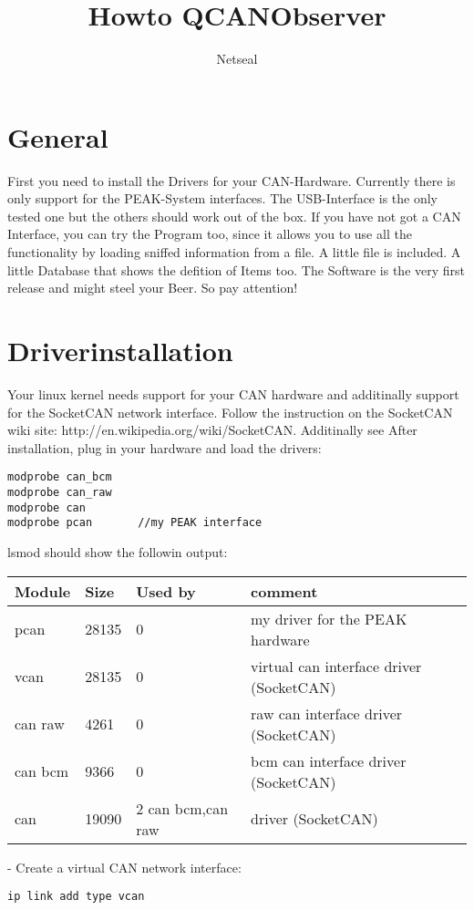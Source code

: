 \documentclass[a4paper,10pt]{article}
\title{Howto QCANObserver}
\author{Netseal}
\begin{document}
\maketitle
\section{General}
First you need to install the Drivers for your CAN-Hardware. Currently there is only support for the PEAK-System interfaces. 
The USB-Interface is the only tested one but the others should work out of the box. If you have not got a CAN Interface, 
you can try the Program too, since it allows you to use all the functionality by loading sniffed information from a file. 
A little file is included. A little Database that shows the defition of Items too. 
The Software is the very first release and might steel your Beer. So pay attention!


\section{Driverinstallation}
Your linux kernel needs support for your CAN hardware and additinally support for the SocketCAN network interface.
Follow the instruction on the SocketCAN wiki site: http://en.wikipedia.org/wiki/SocketCAN.
Additinally see
After installation, plug in your hardware and load the drivers:
\newline
\begin{verbatim}
modprobe can_bcm
modprobe can_raw
modprobe can
modprobe pcan		//my PEAK interface
\end{verbatim}

lsmod should show the followin output:\newline
\begin{tabular}[h]{|p{2cm}|p{2cm}|p{3cm}|p{4cm}|}
\hline
\textbf{Module}&\textbf{Size}&\textbf{Used by}&\textbf{comment}\\
\hline
\hline
pcan & 28135 & 0 & my driver for the PEAK hardware\\
\hline
vcan & 28135 & 0 & virtual can interface driver (SocketCAN)\\
\hline
can raw & 4261 & 0& raw can interface driver (SocketCAN)\\
\hline
can bcm & 9366 & 0& bcm can interface driver (SocketCAN)\\
\hline
can & 19090 & 2 can bcm,can raw & driver (SocketCAN)\\
\hline
\end{tabular}\newline
\newline
- Create a virtual CAN network interface:
\begin{verbatim}     
ip link add type vcan
\end{verbatim}
\end{document}
